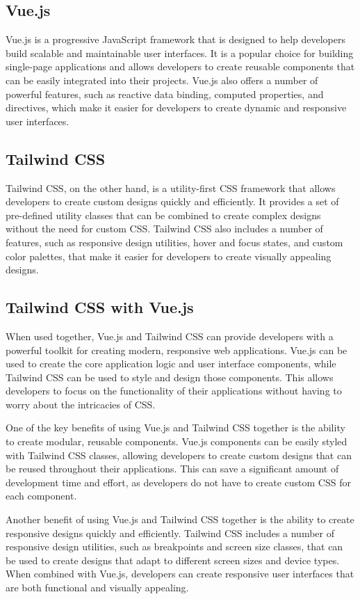 \documentclass[12pt]{report}
\begin{document}
\subsection{Vue.js}
Vue.js is a progressive JavaScript framework that is designed to help developers build scalable and maintainable user interfaces. It is a popular choice for building single-page applications and allows developers to create reusable components that can be easily integrated into their projects. Vue.js also offers a number of powerful features, such as reactive data binding, computed properties, and directives, which make it easier for developers to create dynamic and responsive user interfaces.

\subsection{Tailwind CSS}
Tailwind CSS, on the other hand, is a utility-first CSS framework that allows developers to create custom designs quickly and efficiently. It provides a set of pre-defined utility classes that can be combined to create complex designs without the need for custom CSS. Tailwind CSS also includes a number of features, such as responsive design utilities, hover and focus states, and custom color palettes, that make it easier for developers to create visually appealing designs.

\subsection{Tailwind CSS with Vue.js}
When used together, Vue.js and Tailwind CSS can provide developers with a powerful toolkit for creating modern, responsive web applications. Vue.js can be used to create the core application logic and user interface components, while Tailwind CSS can be used to style and design those components. This allows developers to focus on the functionality of their applications without having to worry about the intricacies of CSS.

One of the key benefits of using Vue.js and Tailwind CSS together is the ability to create modular, reusable components. Vue.js components can be easily styled with Tailwind CSS classes, allowing developers to create custom designs that can be reused throughout their applications. This can save a significant amount of development time and effort, as developers do not have to create custom CSS for each component.

Another benefit of using Vue.js and Tailwind CSS together is the ability to create responsive designs quickly and efficiently. Tailwind CSS includes a number of responsive design utilities, such as breakpoints and screen size classes, that can be used to create designs that adapt to different screen sizes and device types. When combined with Vue.js, developers can create responsive user interfaces that are both functional and visually appealing.
\end{document}
